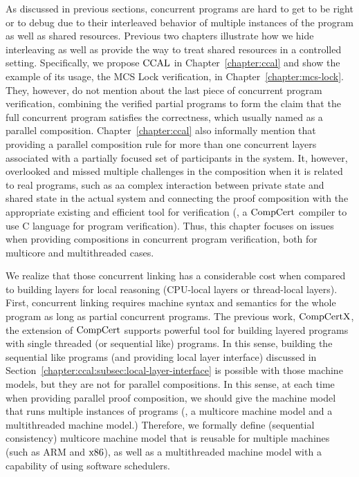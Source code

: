 As discussed in previous sections,  concurrent programs are hard to get to be right or to debug due to their interleaved behavior of multiple instances of the program as well as shared resources. 
Previous two chapters illustrate how we hide interleaving as well as provide the way to treat shared resources in a controlled setting. 
Specifically, we propose  $\mathrm{CCAL}$ in Chapter~\ref{chapter:ccal} and show the example of its usage, the MCS Lock verification, in Chapter~\ref{chapter:mcs-lock}.
They, however, do not mention about the last piece of concurrent program verification, 
combining the verified partial programs to form the claim that the full concurrent program satisfies the correctness, 
which usually named as a parallel composition. 
Chapter~\ref{chapter:ccal} also informally mention that providing a  parallel composition rule for more than one
concurrent layers associated with a partially focused set of participants in the system. 
It, however, overlooked and missed multiple challenges in the composition when it is related to real programs,
such as aa complex interaction between private state and shared state in the actual system
and connecting the proof composition with the appropriate existing and efficient tool for verification (\ie, a $\mathrm{CompCert}$ compiler to use C language for program verification).
Thus, this chapter focuses on  issues when providing compositions in concurrent program verification,
both for multicore and multithreaded cases.

We realize that those concurrent linking has a considerable cost when compared to building layers for local reasoning (CPU-local layers or thread-local layers).
First, concurrent linking requires machine syntax and semantics 
for the whole program as long as partial concurrent programs.
The previous work, $\mathrm{CompCertX}$, the extension of $\mathrm{CompCert}$
supports powerful tool for building layered programs with single threaded (or sequential like) programs.
In this sense, 
building the sequential like programs (and providing local layer interface) discussed in Section~\ref{chapter:ccal:subsec:local-layer-interface} 
is possible with those machine models,
but they are not for parallel compositions. 
In this sense, at each time when providing parallel proof composition, 
we should give the machine model that runs multiple instances of programs (\ie, a multicore machine model and a multithreaded machine model.) 
Therefore, we  formally define (sequential consistency) multicore machine model that is reusable for multiple 
machines (such as ARM and $\mathrm{x86}$),  
as well as a multithreaded machine model with a capability of using software schedulers. 

